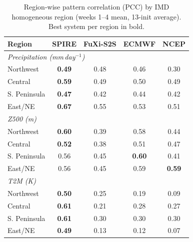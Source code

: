 \begin{table}[t]\centering
\caption{Region-wise pattern correlation (PCC) by IMD homogeneous region (weeks 1--4 mean, 13-init average). Best system per region in bold.}\label{tab:reg_pcc}
\begin{tabular}{lcccc}\toprule
Region & SPIRE & FuXi-S2S & ECMWF & NCEP \\
\midrule
\multicolumn{5}{l}{\emph{Precipitation (mm\,day$^{-1}$)}}\\
Northwest     & \textbf{0.49} & 0.48 & 0.46 & 0.30 \\
Central       & \textbf{0.59} & 0.49 & 0.50 & 0.49 \\
S. Peninsula  & \textbf{0.47} & 0.42 & 0.44 & 0.42 \\
East/NE       & \textbf{0.67} & 0.55 & 0.53 & 0.51 \\
\midrule
\multicolumn{5}{l}{\emph{Z500 (m)}}\\
Northwest     & \textbf{0.60} & 0.39 & 0.58 & 0.44 \\
Central       & \textbf{0.52} & 0.38 & 0.51 & 0.47 \\
S. Peninsula  & 0.56 & 0.45 & \textbf{0.60} & 0.41 \\
East/NE       & 0.56 & 0.45 & 0.59 & \textbf{0.59} \\
\midrule
\multicolumn{5}{l}{\emph{T2M (K)}}\\
Northwest     & \textbf{0.50} & 0.25 & 0.19 & 0.09 \\
Central       & \textbf{0.61} & 0.21 & 0.28 & 0.27 \\
S. Peninsula  & \textbf{0.61} & 0.30 & 0.30 & 0.30 \\
East/NE       & \textbf{0.49} & 0.13 & 0.12 & 0.07 \\
\bottomrule\end{tabular}\end{table}
